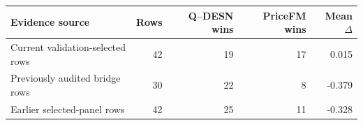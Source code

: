 \begin{tabular}{lrrrr}
\toprule
Evidence source & Rows & Q--DESN wins & PriceFM wins & Mean $\Delta$ \\
\midrule
Current validation-selected rows & 42 & 19 & 17 & 0.015 \\
Previously audited bridge rows & 30 & 22 & 8 & -0.379 \\
Earlier selected-panel rows & 42 & 25 & 11 & -0.328 \\
\bottomrule
\end{tabular}
